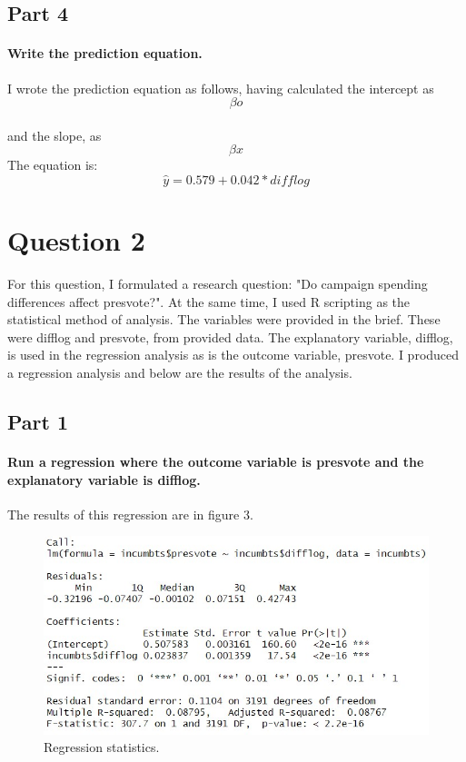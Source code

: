 \documentclass{article}
\begin{document}
		\subsection{Part 4}
	\paragraph{Write the prediction equation.}
	I wrote the prediction equation as follows, having calculated the intercept as 
	\begin{equation}
		\beta o
	\end{equation} 
	\paragraph{}and the slope, as 
	\begin{equation}
		\beta x
	\end{equation}The equation is:
	\begin{equation}
		\hat{y} = 0.579 + 0.042 * difflog
		\end{equation}
	\section{Question 2}

	For this question, I formulated a research question: "Do campaign spending differences affect presvote?". At the same time, I used R scripting as the statistical method of analysis. The variables were provided in the brief. These were difflog and presvote, from provided data. The explanatory variable, difflog, is used in the regression analysis as is the outcome variable, presvote. I produced a regression analysis and below are the results of the analysis.   
\subsection{Part 1}
\paragraph{Run a regression where the outcome variable is presvote and the explanatory variable is difflog.}
The results of this regression are in figure 3.
\begin{figure}[H]
	\centering
	\includegraphics[width=0.9\linewidth]{Question2RegressionAnalysis.jpg}
	\caption{Regression statistics.}
	\label{fig:Regression statistics}
\end{figure}
\end{document}
